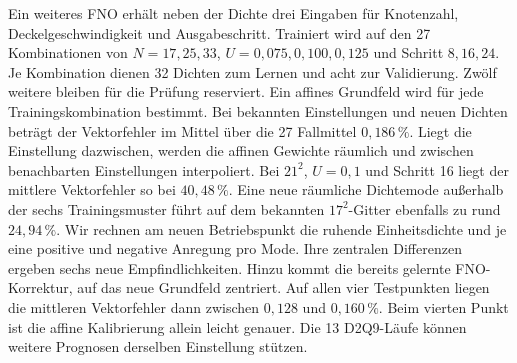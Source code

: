 Ein weiteres FNO erhält neben der Dichte drei Eingaben für Knotenzahl, Deckelgeschwindigkeit und Ausgabeschritt. Trainiert wird auf den 27 Kombinationen von \(N=17,25,33\), \(U=0{,}075,0{,}100,0{,}125\) und Schritt \(8,16,24\). Je Kombination dienen 32 Dichten zum Lernen und acht zur Validierung. Zwölf weitere bleiben für die Prüfung reserviert. Ein affines Grundfeld wird für jede Trainingskombination bestimmt.
Bei bekannten Einstellungen und neuen Dichten beträgt der Vektorfehler im Mittel über die 27 Fallmittel \(0{,}186\,\%\). Liegt die Einstellung dazwischen, werden die affinen Gewichte räumlich und zwischen benachbarten Einstellungen interpoliert. Bei \(21^2\), \(U=0{,}1\) und Schritt 16 liegt der mittlere Vektorfehler so bei \(40{,}48\,\%\). Eine neue räumliche Dichtemode außerhalb der sechs Trainingsmuster führt auf dem bekannten \(17^2\)-Gitter ebenfalls zu rund \(24{,}94\,\%\).
Wir rechnen am neuen Betriebspunkt die ruhende Einheitsdichte und je eine positive und negative Anregung pro Mode. Ihre zentralen Differenzen ergeben sechs neue Empfindlichkeiten. Hinzu kommt die bereits gelernte FNO-Korrektur, auf das neue Grundfeld zentriert. Auf allen vier Testpunkten liegen die mittleren Vektorfehler dann zwischen \(0{,}128\) und \(0{,}160\,\%\). Beim vierten Punkt ist die affine Kalibrierung allein leicht genauer. Die 13 D2Q9-Läufe können weitere Prognosen derselben Einstellung stützen.

